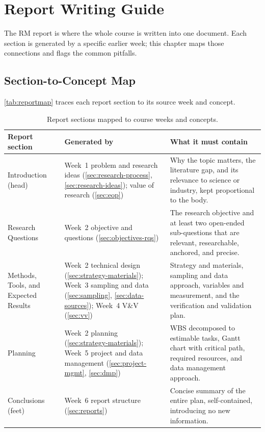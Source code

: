 \documentclass[../main.tex]{subfiles}
\begin{document}
\setlength{\parskip}{3pt}

\chapter{Report Writing Guide}
\label{ch:reportguide}

The RM report is where the whole course is written into one document. Each section is generated by a specific earlier week; this chapter maps those connections and flags the common pitfalls.

\section{Section-to-Concept Map}
\label{sec:report-map}

\autoref{tab:reportmap} traces each report section to its source week and concept.

\begin{table}[H]
\centering
\small
\begin{tabular}{@{}p{2.7cm}p{4.3cm}p{8.1cm}@{}}
\toprule
\textbf{Report section} & \textbf{Generated by} & \textbf{What it must contain} \\
\midrule
Introduction (head) &
Week~1 problem and research ideas (\autoref{sec:research-process}, \autoref{sec:research-ideas}); value of research (\autoref{sec:eop}) &
Why the topic matters, the literature gap, and its relevance to science or industry, kept proportional to the body. \\
\addlinespace
Research Questions &
Week~2 objective and questions (\autoref{sec:objectives-rqs}) &
The research objective and at least two open-ended sub-questions that are relevant, researchable, anchored, and precise. \\
\addlinespace
Methods, Tools, and Expected Results &
Week~2 technical design (\autoref{sec:strategy-materials}); Week~3 sampling and data (\autoref{sec:sampling}, \autoref{sec:data-sources}); Week~4 V\&V (\autoref{sec:vv}) &
Strategy and materials, sampling and data approach, variables and measurement, and the verification and validation plan. \\
\addlinespace
Planning &
Week~2 planning (\autoref{sec:strategy-materials}); Week~5 project and data management (\autoref{sec:project-mgmt}, \autoref{sec:dmp}) &
WBS decomposed to estimable tasks, Gantt chart with critical path, required resources, and data management approach. \\
\addlinespace
Conclusions (feet) &
Week~6 report structure (\autoref{sec:reports}) &
Concise summary of the entire plan, self-contained, introducing no new information. \\
\bottomrule
\end{tabular}
\caption{Report sections mapped to course weeks and concepts.}
\label{tab:reportmap}
\end{table}
\end{document}
